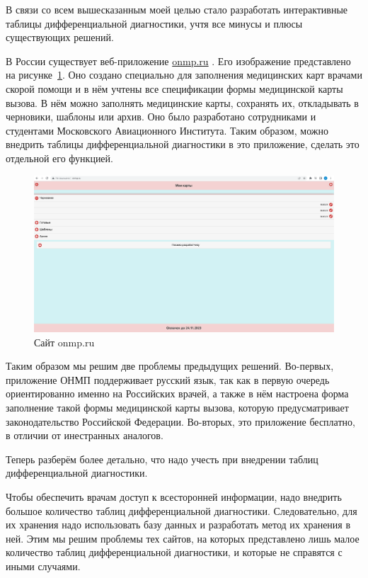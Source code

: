 В связи со всем вышесказанным моей целью стало разработать интерактивные таблицы дифференциальной диагностики, учтя все минусы и плюсы существующих решений. 

В России существует веб-приложение \url{onmp.ru} \cite{onmp}. Его изображение представлено на рисунке~\ref{fig:onmp0}. Оно создано специально для заполнения медицинских карт врачами скорой помощи и в нём учтены все спецификации формы медицинской карты вызова. В нём можно заполнять медицинские карты, сохранять их, откладывать в черновики, шаблоны или архив. Оно было разработано сотрудниками и студентами Московского Авиационного Института. Таким образом, можно внедрить таблицы дифференциальной диагностики в это приложение, сделать это отдельной его функцией. 

\begin{figure}
  \includegraphics[scale=0.3]{src/onmp0.png}
  \caption{Сайт onmp.ru}
  \label{fig:onmp0}
\end{figure}

Таким образом мы решим две проблемы предыдущих решений. Во-первых, приложение ОНМП поддерживает русский язык, так как в первую очередь ориентированно именно на Российских врачей, а также в нём настроена форма заполнение такой формы медицинской карты вызова, которую предусматривает законодательство Российской Федерации. Во-вторых, это приложение бесплатно, в отличии от инестранных аналогов.

Теперь разберём более детально, что надо учесть при внедрении таблиц дифференциальной диагностики.

Чтобы обеспечить врачам доступ к всесторонней информации, надо внедрить большое количество таблиц дифференциальной диагностики. Следовательно, для их хранения надо использовать базу данных и разработать метод их хранения в ней.  Этим мы решим проблемы тех сайтов, на которых представлено лишь малое количество таблиц дифференциальной диагностики, и которые не справятся с иными случаями.


